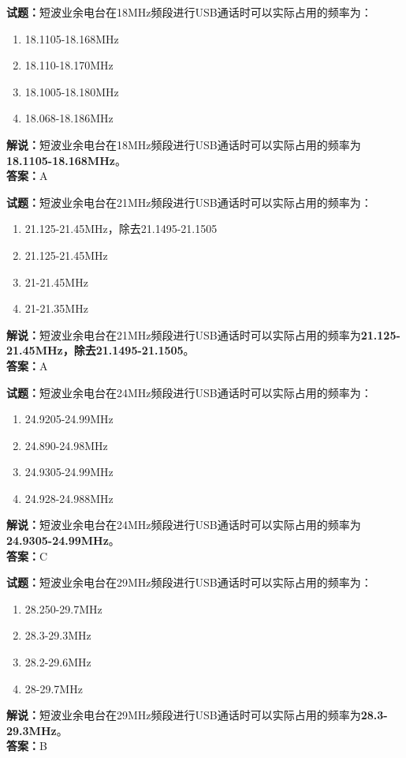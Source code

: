 \documentclass{ctexbook}
\begin{document}
\bigskip


\noindent\textbf{试题：}短波业余电台在18MHz频段进行USB通话时可以实际占用的频率为：
\begin{enumerate}[leftmargin=3em]
\item 18.1105-18.168MHz
\item 18.110-18.170MHz
\item 18.1005-18.180MHz
\item 18.068-18.186MHz
\end{enumerate}
\noindent\textbf{解说：}短波业余电台在18MHz频段进行USB通话时可以实际占用的频率为\textbf{18.1105-18.168MHz}。\\\noindent\textbf{答案：}A



\bigskip


\noindent\textbf{试题：}短波业余电台在21MHz频段进行USB通话时可以实际占用的频率为：
\begin{enumerate}[leftmargin=3em]
\item 21.125-21.45MHz，除去21.1495-21.1505
\item 21.125-21.45MHz
\item 21-21.45MHz
\item 21-21.35MHz
\end{enumerate}
\noindent\textbf{解说：}短波业余电台在21MHz频段进行USB通话时可以实际占用的频率为\textbf{21.125-21.45MHz，除去21.1495-21.1505}。\\\noindent\textbf{答案：}A




\bigskip


\noindent\textbf{试题：}短波业余电台在24MHz频段进行USB通话时可以实际占用的频率为：
\begin{enumerate}[leftmargin=3em]
\item 24.9205-24.99MHz
\item 24.890-24.98MHz
\item 24.9305-24.99MHz
\item 24.928-24.988MHz
\end{enumerate}
\noindent\textbf{解说：}短波业余电台在24MHz频段进行USB通话时可以实际占用的频率为\textbf{24.9305-24.99MHz}。\\\noindent\textbf{答案：}C




\bigskip


\noindent\textbf{试题：}短波业余电台在29MHz频段进行USB通话时可以实际占用的频率为：
\begin{enumerate}[leftmargin=3em]
\item 28.250-29.7MHz
\item 28.3-29.3MHz
\item 28.2-29.6MHz
\item 28-29.7MHz
\end{enumerate}
\noindent\textbf{解说：}短波业余电台在29MHz频段进行USB通话时可以实际占用的频率为\textbf{28.3-29.3MHz}。\\\noindent\textbf{答案：}B
\end{document}
